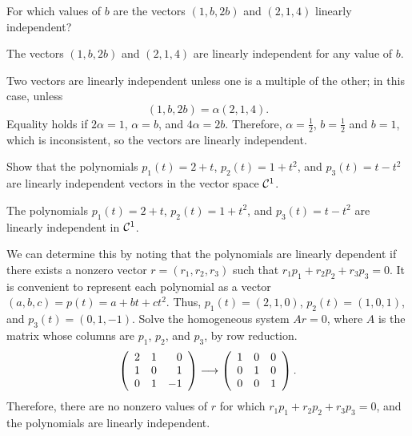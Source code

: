 \documentclass{ximera}
\begin{document}
\begin{exercise} \label{c5.4.4}
For which values of $b$ are the vectors $(1,b,2b)$ and $(2,1,4)$
linearly independent?

\begin{solution}

\ans The vectors $(1,b,2b)$ and $(2,1,4)$ are linearly independent
for any value of $b$.

\soln Two vectors are linearly independent unless one is a multiple
of the other; in this case, unless
\[
(1,b,2b) = \alpha(2,1,4).
\]
Equality holds if $2\alpha = 1$, $\alpha = b$, and $4\alpha = 2b$.
Therefore, $\alpha = \frac{1}{2}$, $b = \frac{1}{2}$ and $b = 1$,
which is inconsistent, so the vectors are linearly independent.

\end{solution}
\end{exercise}

\begin{exercise} \label{c5.4.5}
Show that the polynomials $p_1(t) = 2+t$, $p_2(t) = 1+t^2$, and
$p_3(t) = t-t^2$ are linearly independent vectors in the vector
space ${\cal C}^1$.

\begin{solution}

\ans The polynomials $p_1(t) = 2 + t$, $p_2(t) = 1 + t^2$, and $p_3(t) =
t - t^2$ are linearly independent in ${\cal C}^1$.  

\soln We can determine this
by noting that the polynomials are linearly dependent if there exists
a nonzero vector $r = (r_1,r_2,r_3)$ such that $r_1p_1 + r_2p_2 +
r_3p_3 = 0$.  It is convenient to represent each polynomial as a
vector $(a,b,c) = p(t) = a + bt + ct^2$.  Thus, $p_1(t) = (2,1,0)$, 
$p_2(t) = (1,0,1)$, and $p_3(t) = (0,1,-1)$.  Solve the homogeneous
system $Ar = 0$, where $A$ is the matrix whose columns are $p_1$,
$p_2$, and $p_3$, by row reduction.
\[ \left(\begin{array}{rrr} 2 & 1 & 0 \\ 1 & 0 & 1 \\ 0 & 1 & -1\end{array}\right) \longrightarrow
\left(\begin{array}{rrr} 1 & 0 & 0 \\ 0 & 1 & 0 \\ 0 & 0 & 1\end{array}\right). \]
Therefore, there are no nonzero values of $r$ for which $r_1p_1 + 
r_2p_2 + r_3p_3 = 0$, and the polynomials are linearly independent.


\end{solution}
\end{exercise}
\end{document}

